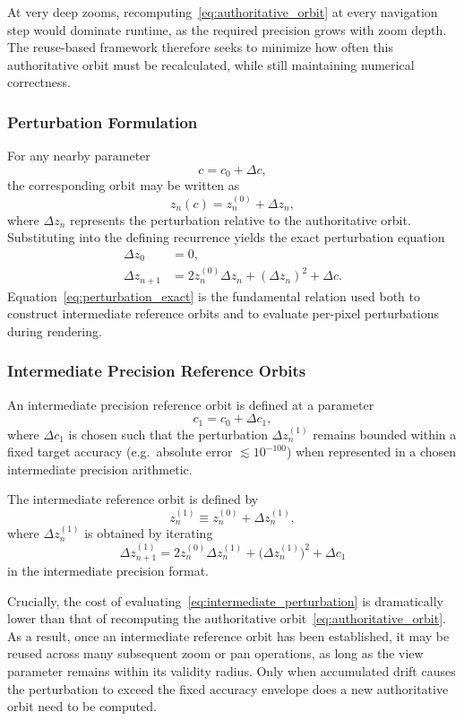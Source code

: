 At very deep zooms, recomputing~\eqref{eq:authoritative_orbit} at every navigation step would dominate runtime,
as the required precision grows with zoom depth.
The reuse-based framework therefore seeks to minimize how often this authoritative orbit must be recalculated,
while still maintaining numerical correctness.

\subsubsection{Perturbation Formulation}

For any nearby parameter
\[
c = c_0 + \Delta c,
\]
the corresponding orbit may be written as
\[
z_n(c) = z^{(0)}_n + \Delta z_n,
\]
where $\Delta z_n$ represents the perturbation relative to the authoritative orbit.
Substituting into the defining recurrence yields the exact perturbation equation
\begin{align}
\Delta z_0 &= 0, \\
\Delta z_{n+1}
&= 2 z^{(0)}_n \Delta z_n + (\Delta z_n)^2 + \Delta c.
\label{eq:perturbation_exact}
\end{align}
Equation~\eqref{eq:perturbation_exact} is the fundamental relation used both to construct intermediate reference orbits
and to evaluate per-pixel perturbations during rendering.

\subsubsection{Intermediate Precision Reference Orbits}

An intermediate precision reference orbit is defined at a parameter
\[
c_1 = c_0 + \Delta c_1,
\]
where $\Delta c_1$ is chosen such that the perturbation $\Delta z^{(1)}_n$ remains bounded within a fixed target accuracy
(e.g.\ absolute error $\lesssim 10^{-100}$) when represented in a chosen intermediate precision arithmetic.

The intermediate reference orbit is defined by
\[
z^{(1)}_n \equiv z^{(0)}_n + \Delta z^{(1)}_n,
\]
where $\Delta z^{(1)}_n$ is obtained by iterating
\begin{equation}
\Delta z^{(1)}_{n+1}
= 2 z^{(0)}_n \Delta z^{(1)}_n
  + \bigl(\Delta z^{(1)}_n\bigr)^2
  + \Delta c_1
\label{eq:intermediate_perturbation}
\end{equation}
in the intermediate precision format.

Crucially, the cost of evaluating~\eqref{eq:intermediate_perturbation} is dramatically lower than that of recomputing
the authoritative orbit~\eqref{eq:authoritative_orbit}.
As a result, once an intermediate reference orbit has been established, it may be reused across many subsequent zoom
or pan operations, as long as the view parameter remains within its validity radius.
Only when accumulated drift causes the perturbation to exceed the fixed accuracy envelope does a new authoritative
orbit need to be computed.

